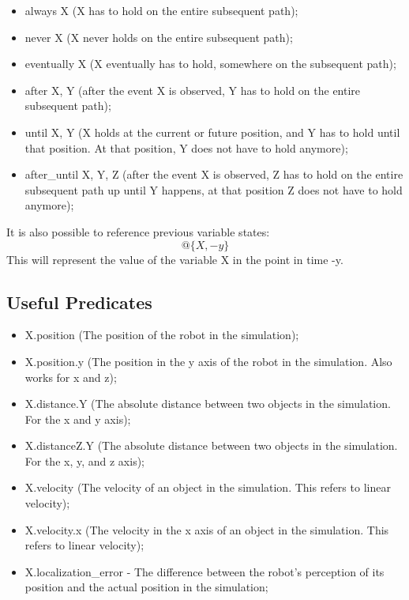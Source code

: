 \documentclass[runningheads]{llncs}
\begin{document}
\begin{itemize}
\item always X (X has to hold on the entire subsequent path);
\item never X (X never holds on the entire subsequent path);
\item eventually X (X eventually has to hold, somewhere on the subsequent path);
\item after X, Y (after the event X is observed, Y has to hold on the entire subsequent path);
\item until X, Y (X holds at the current or future position, and Y has to hold until that position. At that position, Y does not have to hold anymore);
\item after\_until X, Y, Z (after the event X is observed, Z has to hold on the entire subsequent path up until Y happens, at that position Z does not have to hold anymore);
\end{itemize}

\noindent It is also possible to reference previous variable states:
\begin{equation}
@\{X, -y\}
\end{equation}
This will represent the value of the variable X in the point in time -y.

\subsection{Useful Predicates}

\begin{itemize}
\item X.position (The position of the robot in the simulation);
\item X.position.y (The position in the y axis of the robot in the simulation. Also works for x and z);
\item X.distance.Y (The absolute distance between two objects in the simulation. For the x and y axis);
\item X.distanceZ.Y (The absolute distance between two objects in the simulation. For the x, y, and z axis);
\item X.velocity (The velocity of an object in the simulation. This refers to linear velocity);
\item X.velocity.x (The velocity in the x axis of an object in the simulation. This refers to linear velocity);
\item X.localization\_error - The difference between the robot's perception of its position and the actual position in the simulation;
\end{itemize}
\end{document}
